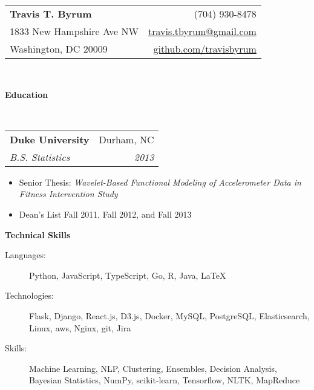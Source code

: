 \documentclass[letterpaper,12pt]{article}
\makeatletter
\newcommand{\resitem}[1]{\item #1 \vspace{-2pt}}
\newcommand{\resheading}[1]{{\large \colorbox{mygrey}{\begin{minipage}{\textwidth}{\textbf{#1 \vphantom{p\^{E}}}}\end{minipage}}}}
\newcommand{\ressubheading}[4]{
\begin{tabular*}{6.9in}{l@{\extracolsep{\fill}}r}
		\textbf{#1} & #2 \\
		\textit{#3} & \textit{#4} \\
\end{tabular*}\vspace{-6pt}}
\makeatother
\begin{document}
\newcommand{\mywebheader}{
\begin{tabular*}
	{7in}
	{l@{\extracolsep{\fill}}r}
		\textbf{\Huge Travis T. Byrum}  & (704) 930-8478\\
		1833 New Hampshire Ave NW & \href{mailto:travis.tbyrum@gmail.com}{travis.tbyrum@gmail.com} \\
		Washington, DC 20009 & \href{https://github.com/travisbyrum}{github.com/travisbyrum}\\
\end{tabular*}
\\
\vspace{0.1in}}

\mywebheader
\resheading{Education}
\\
\ressubheading
  {Duke University}
  {Durham, NC}
  {B.S. Statistics}
  {2013}
  {
	  \footnotesize
		  \begin{itemize}
			  \resitem{Senior Thesis: \textit{Wavelet-Based Functional Modeling of Accelerometer Data in Fitness Intervention Study}}
			  \resitem{Dean’s List Fall 2011, Fall 2012, and Fall 2013}
		  \end{itemize}

\resheading
  {Technical Skills}
	\begin{description}
		\item[Languages:]{\footnotesize Python, JavaScript, TypeScript, Go, R, Java, \LaTeX}
		\item[Technologies:]{\footnotesize Flask, Django, React.js, D3.js, Docker, MySQL, PostgreSQL, Elasticsearch, Linux, aws, Nginx, git, Jira}
		\item[Skills:]{\footnotesize Machine Learning, NLP, Clustering, Ensembles, Decision Analysis, Bayesian Statistics, NumPy, scikit-learn, Tensorflow, NLTK, MapReduce}
	\end{description}

}
\end{document}
